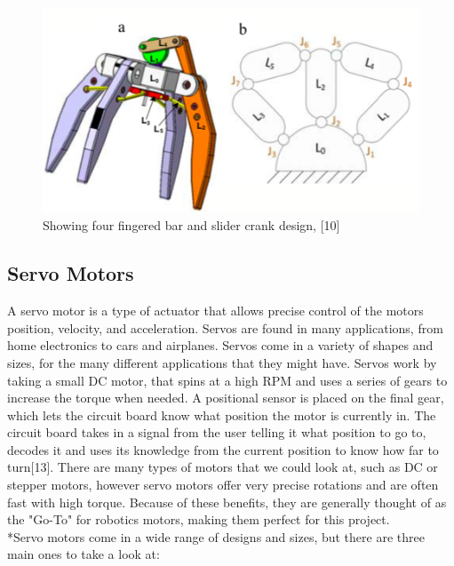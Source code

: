 \documentclass{l4proj}
\begin{document}
\begin{figure}[!ht]
  \centering
  \includegraphics[width=0.75\linewidth]{images/fourfingered.png}   
  \caption{Showing four fingered bar and slider crank design, [10]}
\end{figure}


\subsection{Servo Motors}
A servo motor is a type of actuator that allows precise control of the motors position, velocity, and acceleration. Servos are found in many applications, from home electronics to cars and airplanes. Servos come in a variety of shapes and sizes, for the many different applications that they might have. Servos work by taking a small DC motor, that spins at a high RPM and uses a series of gears to increase the torque when needed. A positional sensor is placed on the final gear, which lets the circuit board know what position the motor is currently in. The circuit board takes in a signal from the user telling it what position to go to, decodes it and uses its knowledge from the current position to know how far to turn[13]. There are many types of motors that we could look at, such as DC or stepper motors, however servo motors offer very precise rotations and are often fast with high torque. Because of these benefits, they are generally thought of as the "Go-To" for robotics motors, making them perfect for this project. 
\\*Servo motors come in a wide range of designs and sizes, but there are three main ones to take a look at:
\end{document}
